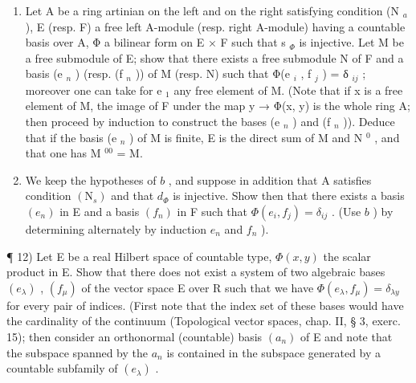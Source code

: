 \begin{enumerate}
\def\labelenumi{\alph{enumi})}
\setcounter{enumi}{1}
\item
  Let A be a ring artinian on the left and on the right satisfying condition (N \(_{a}\) ), E (resp. F) a free left A-module (resp. right A-module) having a countable basis over A, Φ a bilinear form on E × F such that s \(_{\Phi}\) is injective. Let M be a free submodule of E; show that there exists a free submodule N of F and a basis (e \(_{n}\) ) (resp. (f \(_{n}\) )) of M (resp. N) such that Φ(e \(_{i}\) , f \(_{j}\) ) = δ \(_{ij}\) ; moreover one can take for e \(_{1}\) any free element of M. (Note that if x is a free element of M, the image of F under the map y → Φ(x, y) is the whole ring A; then proceed by induction to construct the bases (e \(_{n}\) ) and (f \(_{n}\) )). Deduce that if the basis (e \(_{n}\) ) of M is finite, E is the direct sum of M and N \(^{0}\) , and that one has M \(^{00}\) = M.
\item
  We keep the hypotheses of \(b\) , and suppose in addition that A satisfies condition \((\mathrm{N}_{s})\) and that \(d_{\Phi}\) is injective. Show then that there exists a basis \((e_{n})\) in E and a basis \((f_{n})\) in F such that \(\Phi(e_{i}, f_{j}) = \delta_{ij}\) . (Use \(b\) ) by determining alternately by induction \(e_{n}\) and \(f_{n}\) ).
\end{enumerate}

¶ 12) Let E be a real Hilbert space of countable type, \(\Phi(x, y)\) the scalar product in E. Show that there does not exist a system of two algebraic bases \((e_{\lambda})\) , \((f_{\mu})\) of the vector space E over R such that we have \(\Phi(e_{\lambda}, f_{\mu}) = \delta_{\lambda y}\) for every pair of indices. (First note that the index set of these bases would have the cardinality of the continuum (Topological vector spaces, chap. II, § 3, exerc. 15); then consider an orthonormal (countable) basis \((a_n)\) of E and note that the subspace spanned by the \(a_n\) is contained in the subspace generated by a countable subfamily of \((e_{\lambda})\) .
